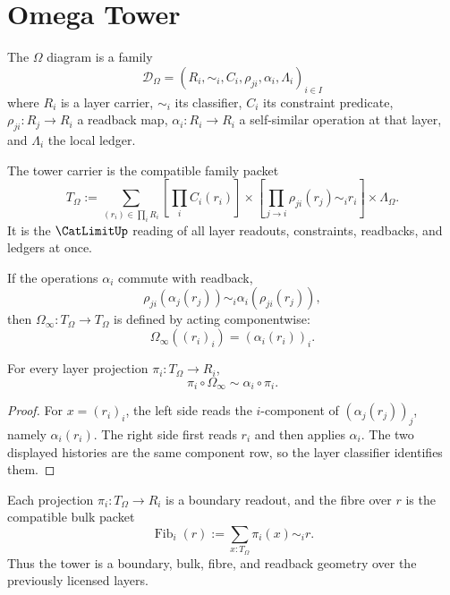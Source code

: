 \section{Omega Tower}
\label{sec:mature-bridge-spine-omega}

\begin{definition}
\label{def:mature-bridge-spine-full-constraint-diagram}
The $\Omega$ diagram is a family
$$
\mathcal D_{\Omega}
=
(R_i,\sim_i,C_i,\rho_{ji},\alpha_i,\Lambda_i)_{i\in I}
$$
where $R_i$ is a layer carrier, $\sim_i$ its classifier, $C_i$ its constraint
predicate, $\rho_{ji}:R_j\to R_i$ a readback map, $\alpha_i:R_i\to R_i$ a
self-similar operation at that layer, and $\Lambda_i$ the local ledger.
\end{definition}

\begin{definition}
\label{def:mature-bridge-spine-omega-tower}
The tower carrier is the compatible family packet
$$
T_{\Omega}
:=
\sum_{(r_i)\in\prod_i R_i}
\left[
\prod_i C_i(r_i)
\right]
\times
\left[
\prod_{j\to i}\rho_{ji}(r_j)\sim_i r_i
\right]
\times
\Lambda_{\Omega}.
$$
It is the $\CatLimitUp$ reading of all layer readouts, constraints, readbacks,
and ledgers at once.
\end{definition}

\begin{definition}
\label{def:mature-bridge-spine-mother-operation}
If the operations $\alpha_i$ commute with readback,
$$
\rho_{ji}(\alpha_j(r_j))
\sim_i
\alpha_i(\rho_{ji}(r_j)),
$$
then $\Omega_{\infty}:T_{\Omega}\to T_{\Omega}$ is defined by acting
componentwise:
$$
\Omega_{\infty}((r_i)_i)=(\alpha_i(r_i))_i.
$$
\end{definition}

\begin{theorem}
\label{thm:mature-bridge-spine-projection-law}
For every layer projection $\pi_i:T_{\Omega}\to R_i$,
$$
\pi_i\circ\Omega_{\infty}
\sim
\alpha_i\circ\pi_i.
$$
\end{theorem}

\begin{proof}
For $x=(r_i)_i$, the left side reads the $i$-component of
$(\alpha_j(r_j))_j$, namely $\alpha_i(r_i)$.  The right side first reads
$r_i$ and then applies $\alpha_i$.  The two displayed histories are the same
component row, so the layer classifier identifies them.
\end{proof}

\begin{principle}
\label{prin:mature-bridge-spine-boundary-fibre}
Each projection $\pi_i:T_{\Omega}\to R_i$ is a boundary readout, and the fibre
over $r$ is the compatible bulk packet
$$
\operatorname{Fib}_i(r)
:=
\sum_{x:T_{\Omega}}\pi_i(x)\sim_i r.
$$
Thus the tower is a boundary, bulk, fibre, and readback geometry over the
previously licensed layers.
\end{principle}

